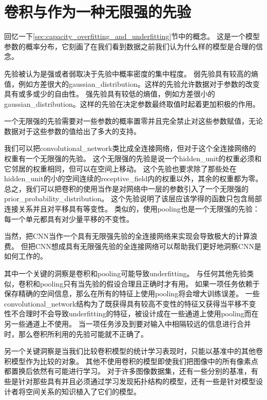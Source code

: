 \section{卷积与作为一种无限强的先验}
\label{sec:convolution_and_pooling_as_an_infinitely_strong_prior}

回忆一下\ref{sec:capacity_overfitting_and_underfitting}节中的概念。
这是一个模型参数的概率分布，它刻画了在我们看到数据之前我们认为什么样的模型是合理的信念。

 
先验被认为是强或者弱取决于先验中概率密度的集中程度。
弱先验具有较高的熵值，例如方差很大的\gls{gaussian_distribution}。这样的先验允许数据对于参数的改变具有或多或少的自由性。
强先验具有较低的熵值，例如方差很小的\gls{gaussian_distribution}。这样的先验在决定参数最终取值时起着更加积极的作用。

一个无限强的先验需要对一些参数的概率置零并且完全禁止对这些参数赋值，无论数据对于这些参数的值给出了多大的支持。

我们可以把\gls{convolutional_network}类比成全连接网络，但对于这个全连接网络的权重有一个无限强的先验。
这个无限强的先验是说一个\gls{hidden_unit}的权重必须和它邻居的权重相同，但可以在空间上移动。
这个先验也要求除了那些处在\gls{hidden_unit}的小的空间连续的\gls{receptive_field}内的权重以外，其余的权重都为零。
总之，我们可以把卷积的使用当作是对网络中一层的参数引入了一个无限强的\gls{prior_probability_distribution}。
这个先验说明了该层应该学得的函数只包含局部连接关系并且对平移具有等变性。
类似的，使用\gls{pooling}也是一个无限强的先验：每一个单元都具有对少量平移的不变性。

当然，把\gls{CNN}当作一个具有无限强先验的全连接网络来实现会导致极大的计算浪费。
但把\gls{CNN}想成具有无限强先验的全连接网络可以帮助我们更好地洞察\gls{CNN}是如何工作的。

其中一个关键的洞察是卷积和\gls{pooling}可能导致\gls{underfitting}。
与任何其他先验类似，卷积和\gls{pooling}只有当先验的假设合理且正确时才有用。
如果一项任务依赖于保存精确的空间信息，那么在所有的特征上使用\gls{pooling}将会增大训练误差。
一些\gls{convolutional_network}结构\citep{Szegedy-et-al-arxiv2014}为了既获得具有较高不变性的特征又获得当平移不变性不合理时不会导致\gls{underfitting}的特征，被设计成在一些通道上使用\gls{pooling}而在另一些通道上不使用。
当一项任务涉及到要对输入中相隔较远的信息进行合并时，那么卷积所利用的先验可能就不正确了。

另一个关键洞察是当我们比较卷积模型的统计学习表现时，只能以基准中的其他卷积模型作为比较的对象。
其他不使用卷积的模型即使我们把图像中的所有像素点都置换后依然有可能进行学习。
对于许多图像数据集，还有一些分别的基准，有些是针对那些具有并且必须通过学习发现拓扑结构的模型，还有一些是针对模型设计者将空间关系的知识植入了它们的模型。

